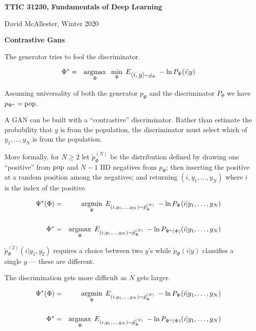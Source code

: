 





{\Huge

  \centerline{\bf TTIC 31230, Fundamentals of Deep Learning}
  \bigskip
  \centerline{David McAllester, Winter 2020}
  \vfill
  \centerline{\bf Contrastive Gans}
\vfill
\vfill


The generator tries to fool the discriminator.

\vfill
\begin{eqnarray*}
\Phi^* & = & \operatorname*{argmax}_\Phi\;\;\min_\Psi\;E_{{\mbox{$\langle i,y\rangle$}} \sim \tilde{p}_\Phi}\;-\ln P_\Psi(i|y)
\end{eqnarray*}

\vfill
Assuming universality of both the generator $p_\Phi$ and the discriminator $P_\Psi$ we have {\color{red} $p_{\Phi^*} = \mathrm{pop}$}.



A GAN can be built with a ``contrastive'' discriminator.  Rather than estimate the probability that $y$ is from the population, the discriminator must select which
of $y_1,\ldots,y_N$ is from the population.

\vfill
More formally, for $N \geq 2$ let {\color{red} $\tilde{p}_\Phi^{(N)}$} be the distribution defined by drawing one ``positive'' from $\mathrm{pop}$ and $N-1$ IID negatives from $p_\Phi$;
then inserting the positive at a random position among the negatives; and returning $(i,y_1,\ldots,y_N)$ where
$i$ is the index of the positive.


\begin{eqnarray*}
\Psi^*(\Phi) & = & \operatorname*{argmin}_\Psi\; E_{(i,y_1,\ldots,y_{N})\sim \tilde{p}_\Phi^{(N)}} \;- \ln P_\Psi(i|y_1,\ldots,y_{N}) \\
\\
\Phi^* & = & \operatorname*{argmax}_\Phi\; E_{(i,y_1,\ldots,y_{N})\sim \tilde{p}_\Phi^{(N)}} \;- \ln P_{\Psi^*(\Phi)}(i|y_1,\ldots,y_{N})
\end{eqnarray*}

\vfill
{\color{red} $\tilde{p}_\Phi^{(2)}(i|y_1,y_2)$} requires a choice between two $y$'s while {\color{red} $\tilde{p}_\Phi(i|y)$} classifies a single $y$ --- these are different.

\vfill
The discrimination gets more difficult as $N$ gets larger.


\begin{eqnarray*}
\Psi^*(\Phi) & = & \operatorname*{argmin}_\Psi\; E_{(i,y_1,\ldots,y_{N})\sim \tilde{p}_\Phi^{(N)}} \;- \ln P_\Psi(i|y_1,\ldots,y_{N}) \\
\\
\Phi^* & = & \operatorname*{argmax}_\Phi\; E_{(i,y_1,\ldots,y_{N})\sim \tilde{p}_\Phi^{(N)}} \;- \ln P_{\Psi^*(\Phi)}(i|y_1,\ldots,y_{N})
\end{eqnarray*}

}
